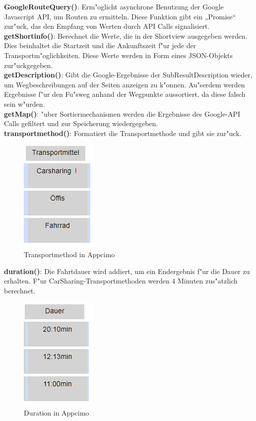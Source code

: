 \documentclass[a4paper, 11pt]{scrreprt}
\begin{document}
\textbf{GoogleRouteQuery()}: Erm"oglicht asynchrone Benutzung der Google Javascript API, um Routen zu ermitteln. Diese Funktion gibt ein „Promise“ zur"uck, das den Empfang von Werten durch API Calls signalisiert.\\

\textbf{getShortinfo()}:  Berechnet die Werte, die in der Shortview ausgegeben werden. Dies beinhaltet die Startzeit  und die Ankunftszeit f"ur jede der Transportm"oglichkeiten. Diese Werte werden in Form eines JSON-Objekts zur"uckgegeben. \\

\textbf{getDescription()}: Gibt die Google-Ergebnisse der SubResultDescription wieder, um Wegbeschreibungen auf der Seiten anzeigen zu k"onnen. Au"serdem werden Ergebnisse f"ur den Fu"sweg anhand der Wegpunkte aussortiert, da diese falsch sein w"urden.\\

\textbf{getMap()}: "uber Sortiermechanismen werden die Ergebnisse des Google-API Calls gefiltert und zur Speicherung wiedergegeben.\\

\textbf{transportmethod()}:  Formatiert die Transportmethode und gibt sie zur"uck.

\begin{figure} [H]
\begin{center}
\includegraphics[scale=1]{transportmethod.png}
\caption{Transportmethod in Appcimo}
\label{transportmethod}
\end{center}
\end{figure}


\textbf{duration()}:  Die Fahrtdauer wird addiert, um ein Endergebnis f"ur die Dauer zu erhalten. F"ur CarSharing-Transportmethoden werden 4 Minuten zus"atzlich berechnet.


\begin{figure} [H]
\begin{center}
\includegraphics[scale=1]{duration.png}
\caption{Duration in Appcimo}
\label{Duration}
\end{center}
\end{figure}
\end{document}
